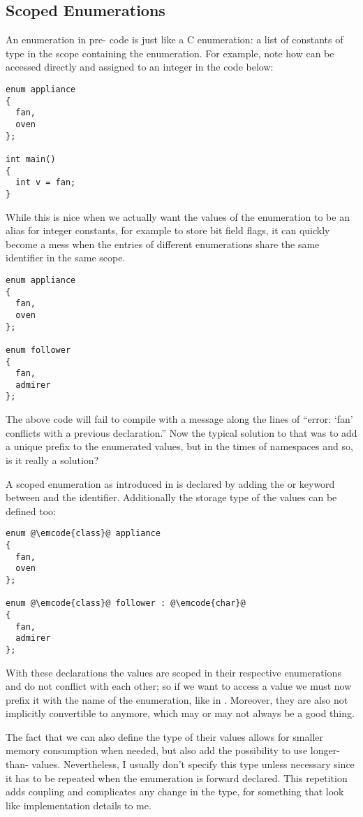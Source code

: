 \subsection{Scoped Enumerations}

An enumeration in pre- code is just like a C enumeration: a list
of constants of type  in the scope containing the
enumeration. For example, note how  can be
accessed directly and assigned to an integer in the code below:

\begin{lstlisting}
enum appliance
{
  fan,
  oven
};

int main()
{
  int v = fan;
}
\end{lstlisting}

While this is nice when we actually want the values of the
enumeration to be an alias for integer constants, for example to store
bit field flags, it can quickly become a mess when the entries of
different enumerations share the same identifier in the same scope.

\begin{lstlisting}
enum appliance
{
  fan,
  oven
};

enum follower
{
  fan,
  admirer
};
\end{lstlisting}

The above code will fail to compile with a message along the lines of
``error: ‘fan’ conflicts with a previous declaration.'' Now the
typical solution to that was to add a unique prefix to the enumerated
values, but in the times of namespaces and so, is it really a solution?

\bigskip

A scoped enumeration as introduced in  is declared by adding the
 or  keyword between  and the
identifier. Additionally the storage type of the values can be defined
too:

\begin{lstlisting}
enum @\emcode{class}@ appliance
{
  fan,
  oven
};

enum @\emcode{class}@ follower : @\emcode{char}@
{
  fan,
  admirer
};
\end{lstlisting}

With these declarations the values are scoped in their respective
enumerations and do not conflict with each other; so if we want to
access a value we must now prefix it with the name of the enumeration,
like in . Moreover, they are also not implicitly
convertible to  anymore, which may or may not always be a
good thing.

The fact that we can also define the type of their values allows for
smaller memory consumption when needed, but also add the possibility
to use longer-than- values. Nevertheless, I usually don't
specify this type unless necessary since it has to be repeated when
the enumeration is forward declared. This repetition adds coupling and
complicates any change in the type, for something that look like
implementation details to me.


